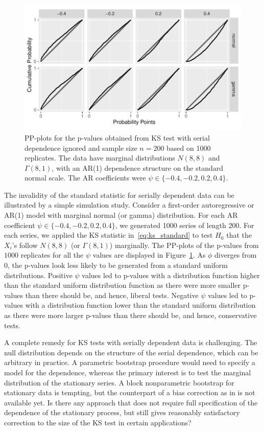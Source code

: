 \documentclass[12pt, letterpaper, titlepage]{article}
\begin{document}
\begin{figure}[tbp]
  \centering
  \includegraphics[width=\textwidth]{pp_s.pdf}
  \caption{PP-plots for the p-values obtained from KS test with serial
    dependence ignored and sample size $n = 200$ based on 1000
    replicates. The data have marginal distributions $N(8, 8)$ and
    $\Gamma(8, 1)$, with an AR(1) dependence structure on the standard normal
    scale. The AR coefficients were $\psi \in \{-0.4, -0.2,  0.2,  0.4\}$.
  }
  \label{fig:pp_s}
\end{figure}


The invalidity of the standard statistic for serially dependent data can be
illustrated by a simple simulation study. Consider a first-order autoregressive
or AR(1) model with marginal normal (or gamma) distribution. For each AR
coefficient $\psi \in \{-0.4, -0.2, 0.2, 0.4\}$, we generated 1000
series of length 200. For each series, we applied the KS statistic
in~\eqref{eq:ks_standard} to test $H_0$ that the $X_i$'s follow $N(8, 8)$ (or 
$\Gamma(8,1)$) marginally. The PP-plots of the p-values from $1000$ replicates 
for all the $\psi$ values are displayed in Figure~\ref{fig:pp_s}. As 
$\phi$ diverges from 0, the p-values look less likely to be generated from a 
standard uniform distributions. Positive $\psi$ values led to p-values with a 
distribution function higher than the standard uniform distribution function as 
there were more smaller p-values than there should be, and hence, 
liberal tests. Negative $\psi$ values led to p-values with a 
distribution function lower than the standard uniform distribution as there 
were more larger p-values than there should be, and hence, conservative tests.


A complete remedy for KS tests with serially dependent data is
challenging. The null distribution depends on the structure of the serial
dependence, which can be arbitrary in practice. A parametric bootstrap procedure
would need to specify a model for the dependence, whereas the primary interest
is to test the marginal distribution of the stationary series. A block
nonparametric bootstrap for stationary data \citep{kunsch1989jackknife} is
tempting, but the counterpart of a bias correction as in
\citet{babu2004goodness} is not available yet. Is there any approach that does
not require full specification of the dependence of the stationary process,
but still gives reasonably satisfactory correction to the size of the KS test in
certain applications?
\end{document}
